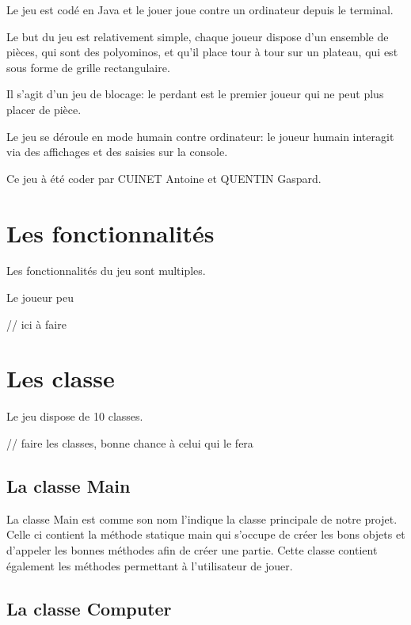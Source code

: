\documentclass[a4paper, titlepage, french]{report}
\begin{document}
\bigskip

Le jeu est codé en Java et le jouer joue contre un ordinateur depuis le terminal.

\bigskip

Le but du jeu est relativement simple, chaque joueur dispose d'un ensemble de pièces, qui sont des polyominos, et qu'il place
tour à tour sur un plateau, qui est sous forme de grille rectangulaire. 

Il s'agit d'un jeu de blocage: le perdant est le premier
joueur qui ne peut plus placer de pièce.

Le jeu se déroule en mode
humain contre ordinateur: le joueur humain interagit via des affichages et des saisies sur la console.

\bigskip

Ce jeu à été coder par CUINET Antoine et QUENTIN Gaspard.



\newpage

\chapter{Les fonctionnalités}

Les fonctionnalités du jeu sont multiples.

Le joueur peu

\color{red}
// ici à faire
\color{black}

\chapter{Les classe}

Le jeu dispose de 10 classes.
\bigskip

\color{red}
// faire les classes, bonne chance à celui qui le fera
\color{black}

\section{La classe Main}

La classe Main est comme son nom l'indique la classe principale de notre projet.
Celle ci contient la méthode statique main qui s'occupe de créer les bons objets et
d'appeler les bonnes méthodes afin de créer une partie.
Cette classe contient également les méthodes permettant à l'utilisateur de jouer.

\bigskip

\section{La classe Computer}
\end{document}
